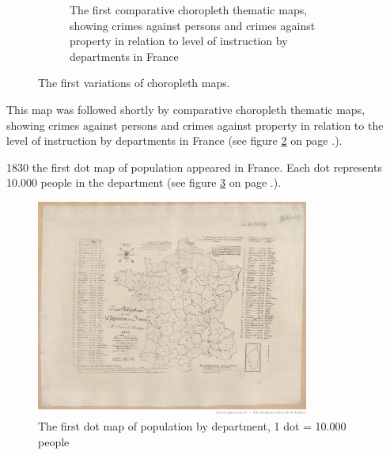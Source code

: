 \begin{figure}[!htb]
\begin{subfigure}[b]{0.4\textwidth}
    \caption{The first comparative choropleth thematic maps, showing crimes against persons and crimes against property in relation to level of instruction by departments in France}
    \label{fig:second-choropleth}
  \end{subfigure}
  \caption[
    First variations of choropleth maps, Urldate: 07.2016 \newline
    \small\texttt{\url{http://datavis.ca/milestones//admin/uploads/images/dupin.gif}} \newline
    \small\texttt{\url{https://axismaps.github.io/thematic-cartography/images/divxdiv.png}}
  ]{
    The first variations of choropleth maps.
  }
\end{figure}
\cbend

This map was followed shortly by comparative choropleth thematic maps, showing crimes against persons and crimes against property in relation to the level of instruction by departments in France (see figure \ref{fig:second-choropleth} on page \pageref{fig:second-choropleth}.).

1830 the first dot map of population appeared in France. Each dot represents 10.000 people in the department (see figure \ref{fig:first-dotmap} on page \pageref{fig:first-dotmap}.).

\begin{figure}[!htb]
\centering
\includegraphics[width=0.8\textwidth,keepaspectratio]{images/history/montizon-dotmap2.jpeg}
\caption[
    The first dot map of population by department, 1 dot = 10.000 people, Urldate: 07.2016 \newline
\small\texttt{\url{http://gallica.bnf.fr/ark:/12148/btv1b8492261j/f1.highres}}
]{The first dot map of population by department, 1 dot = 10.000 people}
\label{fig:first-dotmap}
\end{figure}

